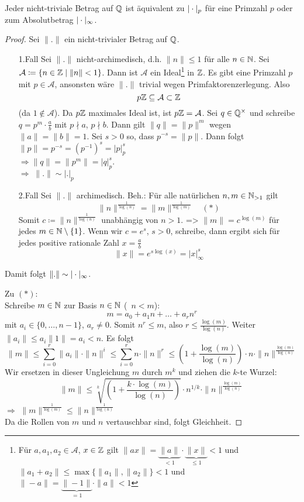 \documentclass[../main.tex]{subfiles}
\begin{document}
\begin{theorem}
    Jeder nicht-triviale Betrag auf $\mathbb{Q}$ ist äquivalent zu $|\cdot|_p$ für eine Primzahl $p$ oder zum Absolutbetrag $|\cdot|_\infty$.
\end{theorem}
\begin{proof}
    Sei $\|.\|$ ein nicht-trivialer Betrag auf $\mathbb{Q}$.
    \begin{itemize}
        \item[1.Fall]
        Sei $\|.\|$ nicht-archimedisch, d.h. $\|n\|\leq 1$ für alle $n\in \mathbb{N}$.
        Sei $\mathcal{A}\coloneqq \{n\in \mathbb{Z}\mid \|n\| <1\}$.
        Dann ist $\mathcal{A}$ ein Ideal\footnote{Für $a,a_1,a_2\in \mathcal{A}$, $x\in\mathbb{Z}$ gilt $\|ax\| = \underbrace{\|a\|}_{<1} \cdot \underbrace{\|x\|}_{\leq 1}<1$ und $\|a_1+a_2\|\leq \max\{\|a_1\|, \|a_2\|\}<1$ und $\|-a\|= \underbrace{\|-1\|}_{=1}\cdot \|a\| <1$} in $\mathbb{Z}$.
        Es gibt eine Primzahl $p$ mit $p\in \mathcal{A}$, ansonsten wäre $\|.\|$ trivial wegen Primfaktorenzerlegung. Also
        $$p\mathbb{Z}\subseteq\mathcal{A}\subset \mathbb{Z}$$ (da $1\notin \mathcal{A}$).
        Da $p\mathbb{Z}$ maximales Ideal ist, ist $p\mathbb{Z} = \mathcal{A}$.
        Sei $q\in \mathbb{Q}^\times$ und schreibe $q=p^m\cdot \frac{a}{b}$ mit $p\nmid a$, $p\nmid b$.
        Dann gilt $\|q\| = \|p\|^m$ wegen $\|a\| = \|b\| =1$.
        Sei $s>0$ so, dass $p^{-s} = \|p\|$.
        Dann folgt $\|p\| =p^{-s} = (p^{-1})^s= |p|_p^s$\\
        $\Longrightarrow\|q\| = \|p^m\| = |q|_p^s$.\\
        $\Longrightarrow\;\|.\| \sim |.|_p$

        \item[2.Fall]
        Sei $\|.\|$ archimedisch.
        Beh.: Für alle natürlichen $n,m\in\mathbb{N}_{>1}$ gilt
        $$\|n\|^{\frac{1}{\log(n)}} = \|m\|^{\frac{1}{\log(m)}}\quad (*)$$
        Somit $c\coloneqq\|n\|^{\frac{1}{\log(n)}}$ unabhängig von $n>1$.
        => $\|m\| = c^{\log(m)}$ für jedes $m\in \mathbb{N}\setminus\{1\}$.
        Wenn wir $c = e^s$, $s>0$, schreibe, dann ergibt sich für jedes positive rationale Zahl $x=\frac{a}{b}$
        $$\|x\| = e^{s\log(x)} = |x|_\infty^s$$
    \end{itemize}
    Damit folgt $\|.\|\sim |\cdot|_\infty$.

    Zu $(*)$:\\
    Schreibe $m\in \mathbb{N}$ zur Basis $n\in\mathbb{N}$ (\obda\ $n<m$):
    $$m= a_0 + a_1 n+\dots+a_rn^r$$
    mit $a_i\in \{0,\dots,n-1\}$, $a_r \neq 0$.
    Somit $n^r\leq m$, also $r\leq \frac{\log(m)}{\log(n)}$.
    Weiter $\|a_i\| \leq a_i \|1\| = a_i<n$.
    Es folgt $$\|m\|\leq \sum_{i=0}^r \|a_i\| \cdot \|n\|^i\leq \sum_{i=0}^r n \cdot \|n\|^r \leq \left(1+\frac{\log(m)}{\log(n)}\right) \cdot n \cdot \|n\|^{\frac{\log(m)}{\log(n)}}$$
    Wir ersetzen in dieser Ungleichung $m$ durch $m^k$ und ziehen die $k$-te Wurzel:
    $$\|m\| \leq \sqrt[k]{\left(1+\frac{k\cdot\log(m)}{\log(n)}\right)}\cdot n^{1/k} \cdot \|n\|^{\frac{\log(m)}{\log(n)}}$$
    $\Longrightarrow$ $\|m\|^{\frac{1}{\log(m)}} \leq \|n\|^{\frac{1}{\log(n)}}$\\
    Da die Rollen von $m$ und $n$ vertauschbar sind, folgt Gleichheit.
\end{proof}
\end{document}
